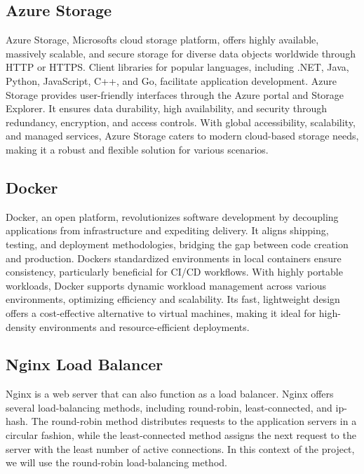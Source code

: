 \subsection{Azure Storage}

Azure Storage, Microsoft\textquotesingle s cloud storage platform,
offers highly available, massively scalable, and secure storage for
diverse data objects worldwide through HTTP or HTTPS. Client libraries
for popular languages, including .NET, Java, Python, JavaScript, C++,
and Go, facilitate application development. Azure Storage provides
user-friendly interfaces through the Azure portal and Storage Explorer.
It ensures data durability, high availability, and security through
redundancy, encryption, and access controls. With global accessibility,
scalability, and managed services, Azure Storage caters to modern
cloud-based storage needs, making it a robust and flexible solution for
various scenarios.


\subsection{Docker}

Docker, an open platform, revolutionizes software development by
decoupling applications from infrastructure and expediting delivery. It
aligns shipping, testing, and deployment methodologies, bridging the gap
between code creation and production. Docker\textquotesingle s
standardized environments in local containers ensure consistency,
particularly beneficial for CI/CD workflows. With highly portable
workloads, Docker supports dynamic workload management across various
environments, optimizing efficiency and scalability. Its fast,
lightweight design offers a cost-effective alternative to virtual
machines, making it ideal for high-density environments and
resource-efficient deployments.


\subsection{Nginx Load Balancer}

Nginx is a web server that can also function as a load balancer. Nginx
offers several load-balancing methods, including round-robin,
least-connected, and ip-hash. The round-robin method distributes
requests to the application servers in a circular fashion, while the
least-connected method assigns the next request to the server with the
least number of active connections. In this context of the project, we
will use the round-robin load-balancing method.